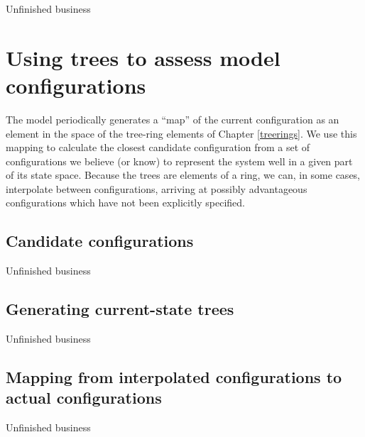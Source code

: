 Unfinished business

\section{Using trees to assess model configurations}

The model periodically generates a ``map'' of the current
configuration as an element in the space of the tree-ring elements of
Chapter \ref{treerings}.  We use this mapping to calculate the
closest candidate configuration from a set of configurations we
believe (or know) to represent the system well in a given part of its
state space. Because the trees are elements of a ring, we can, in some cases,
interpolate between configurations, arriving at possibly advantageous
configurations which have not been explicitly specified.

\subsection{Candidate configurations}

Unfinished business

\subsection{Generating current-state trees}

Unfinished business

\subsection{Mapping from interpolated configurations to actual
  configurations}

Unfinished business





